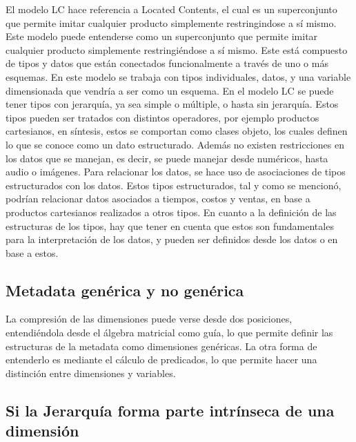 \documentclass[DIV=calc, paper=a4, fontsize=11pt, twocolumn]{scrartcl}	 %
\begin{document}
El modelo LC hace referencia a Located Contents, el cual es un superconjunto que permite imitar cualquier producto simplemente restringindose a s\'{i} mismo. Este modelo puede entenderse como un superconjunto que permite imitar cualquier producto simplemente restringi\'{e}ndose a s\'{i} mismo. Este est\'{a} compuesto de tipos y datos que est\'{a}n conectados funcionalmente a trav\'{e}s de uno o más esquemas. En este modelo se trabaja con tipos individuales, datos, y una variable dimensionada que vendr\'{i}a a ser como un esquema.
En el modelo LC se puede tener tipos con jerarqu\'{i}a, ya sea simple o m\'{u}ltiple, o hasta sin jerarqu\'{i}a. Estos tipos pueden ser tratados con distintos operadores, por ejemplo productos cartesianos, en s\'{i}ntesis, estos se comportan como clases objeto, los cuales definen lo que se conoce como un dato estructurado. Adem\'{a}s no existen restricciones en los datos que se manejan, es decir, se puede manejar desde num\'{e}ricos, hasta audio o im\'{a}genes.
Para relacionar los datos, se hace uso de asociaciones de tipos estructurados con los datos. Estos tipos estructurados, tal y como se mencion\'{o}, podr\'{i}an relacionar datos asociados a tiempos, costos y ventas, en base a productos cartesianos realizados a otros tipos.
En cuanto a la definici\'{o}n de las estructuras de los tipos, hay que tener en cuenta que estos son fundamentales para la interpretaci\'{o}n de los datos, y pueden ser definidos desde los datos o en base a estos.


\subsection*{Metadata gen\'{e}rica y no gen\'{e}rica}

La compresi\'{o}n de las dimensiones puede verse desde dos posiciones, entendi\'{e}ndola desde el \'{a}lgebra matricial como gu\'{i}a, lo que permite definir las estructuras de la metadata como dimensiones gen\'{e}ricas.
La otra forma de entenderlo es mediante el c\'{a}lculo de predicados, lo que permite hacer una distinci\'{o}n entre dimensiones y variables. 


\subsection*{Si la Jerarqu\'{i}a forma parte intr\'{i}nseca de una dimensi\'{o}n}
\end{document}

